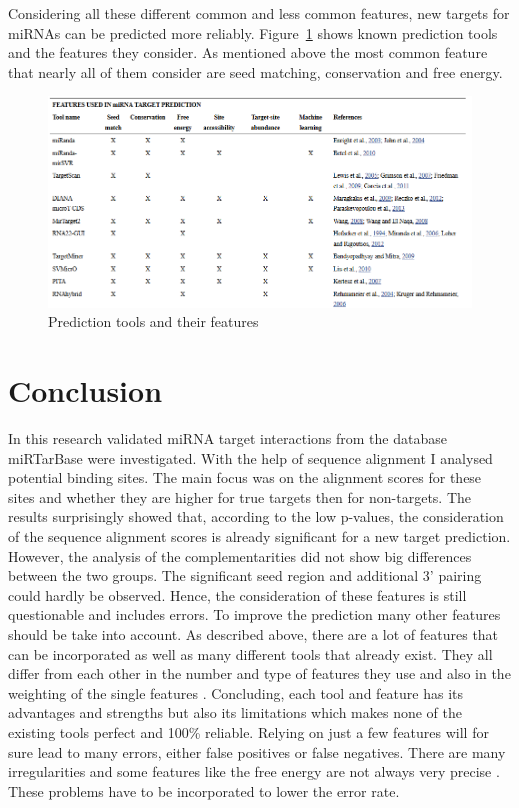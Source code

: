 \documentclass[11pt, a4paper, twoside]{book}
\begin{document}
   
Considering all these different common and less common features, new targets for miRNAs can be predicted more reliably. Figure~\ref{fig:tools} shows known prediction tools and the features they consider. As mentioned above the most common feature that nearly all of them consider are seed matching, conservation and free energy. \\


\begin{figure}
\centering
\includegraphics[width=\textwidth]{results/tools.PNG}
\caption{Prediction tools and their features}
\label{fig:tools}
\end{figure}


\vspace{2cm}



\chapter{Conclusion}
\label{chapter:conlusion}

In this research validated miRNA target interactions from the database miRTarBase were investigated. With the help of sequence alignment I analysed potential binding sites. The main focus was on the alignment scores for these sites and whether they are higher for true targets then for non-targets. The results surprisingly showed that, according to the low p-values, the consideration of the sequence alignment scores is already significant for a new target prediction. However, the analysis of the complementarities did not show big differences between the two groups. The significant seed region and additional 3' pairing could hardly be observed. Hence, the consideration of these features is still questionable and includes errors. To improve the prediction many other features should be take into account.
As described above, there are a lot of features that can be incorporated as well as many different tools that already exist. They all differ from each other in the number and type of features they use and also in the weighting of the single features \cite{Peterson}. Concluding, each tool and feature has its advantages and strengths but also its limitations which makes none of the existing tools perfect and 100\% reliable. Relying on just a few features will for sure lead to many errors, either false positives or false negatives. There are many irregularities and some features like the free energy are not always very precise \cite{Peterson}. These problems have to be incorporated to lower the error rate.\\
\end{document}
